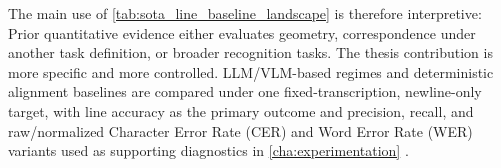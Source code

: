 \noindent The main use of \autoref{tab:sota_line_baseline_landscape} is therefore interpretive: Prior quantitative evidence either evaluates geometry, correspondence under another task definition, or broader recognition tasks. The thesis contribution is more specific and more controlled. LLM/VLM-based regimes and deterministic alignment baselines are compared under one fixed-transcription, newline-only target, with line accuracy as the primary outcome and precision, recall, and raw/normalized Character Error Rate (CER) and Word Error Rate (WER) variants used as supporting diagnostics in \autoref{cha:experimentation} .
